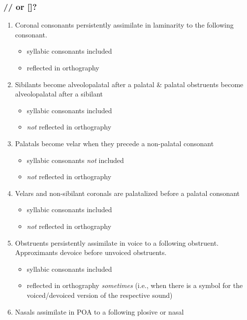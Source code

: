 \documentclass[a4paper,11pt,oneside,openany]{memoir}
\newcommand{\bripa}[1]{[#1]}
\newcommand{\phipa}[1]{/#1/}
\begin{document}
\subsubsection{\phipa{\glotstop} or \bripa{\glotstop}?}

\begin{enumerate}
    \item Coronal consonants persistently assimilate in laminarity to the following consonant.
    \begin{itemize}
        \item syllabic consonants included
        \item reflected in orthography
    \end{itemize}
    \item Sibilants become alveolopalatal after a palatal \& palatal obstruents become alveolopalatal after a sibilant
    \begin{itemize}
        \item syllabic consonants included
        \item \emph{not} reflected in orthography
    \end{itemize}
    \item Palatals become velar when they precede a non-palatal consonant
    \begin{itemize}
        \item syllabic consonants \emph{not} included
        \item \emph{not} reflected in orthography
    \end{itemize}
    \item Velars and non-sibilant coronals are palatalized before a palatal consonant
    \begin{itemize}
        \item syllabic consonants included
        \item \emph{not} reflected in orthography
    \end{itemize}
    \item Obstruents persistently assimilate in voice to a following obstruent. Approximants devoice before unvoiced obstruents.
    \begin{itemize}
        \item syllabic consonants included
        \item reflected in orthography \emph{sometimes} (i.e., when there is a symbol for the voiced/devoiced version of the respective sound)
    \end{itemize}
    \item Nasals assimilate in POA to a following plosive or nasal

\end{enumerate}
\end{document}

